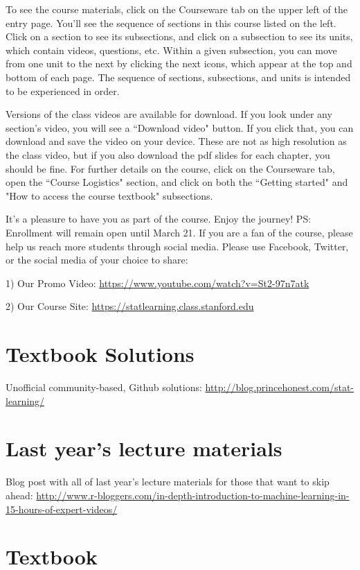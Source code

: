 \documentclass{article}
\begin{document}
To see the course materials, click on the Courseware tab on the upper left of the entry page. You'll see the sequence of sections in this course listed on the left. Click on a section to see its subsections, and click on a subsection to see its units, which contain videos, questions, etc. Within a given subsection, you can move from one unit to the next by clicking the next icons, which appear at the top and bottom of each page. The sequence of sections, subsections, and units is intended to be experienced in order.

Versions of the class videos are available for download. If you look under any section's video, you will see a ``Download video" button. If you click that, you can download and save the video on your device. These are not as high resolution as the class video, but if you also download the pdf slides for each chapter, you should be fine.
For further details on the course, click on the Courseware tab, open the ``Course Logistics" section, and click on both the ``Getting started" and "How to access the course textbook" subsections.

It's a pleasure to have you as part of the course. Enjoy the journey!
PS: Enrollment will remain open until March 21. If you are a fan of the course, please help us reach more students through social media. Please use Facebook, Twitter, or the social media of your choice to share:

1) Our Promo Video: \url{https://www.youtube.com/watch?v=St2-97n7atk}

2) Our Course Site: \url{https://statlearning.class.stanford.edu}


\section{Textbook Solutions}
Unofficial community-based, Github solutions: \url{http://blog.princehonest.com/stat-learning/}

\section{Last year's lecture materials}
Blog post with all of last year's lecture materials for those that want to skip ahead: 
\url{http://www.r-bloggers.com/in-depth-introduction-to-machine-learning-in-15-hours-of-expert-videos/}

\section{Textbook}
\end{document}
